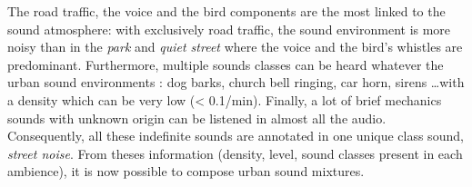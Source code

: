 \documentclass[a4,11pt,twocolumn]{article}
\begin{document}
%
%

The road traffic, the voice and the bird components are the most linked to the sound atmosphere: with exclusively road traffic, the sound environment is more noisy than in the \textit{park} and \textit{quiet street} where the voice and the bird's whistles are predominant. Furthermore, multiple sounds classes can be heard whatever the urban sound environments : dog barks, church bell ringing, car horn, sirens \dots with a density which can be very low (< 0.1/min). Finally, a lot of brief mechanics sounds with unknown origin can be listened in almost all the audio. Consequently, all these indefinite sounds are annotated in one unique class sound, \textit{street noise}. From theses information (density, level, sound classes present in each ambience), it is now possible to compose urban sound mixtures.
\end{document}
